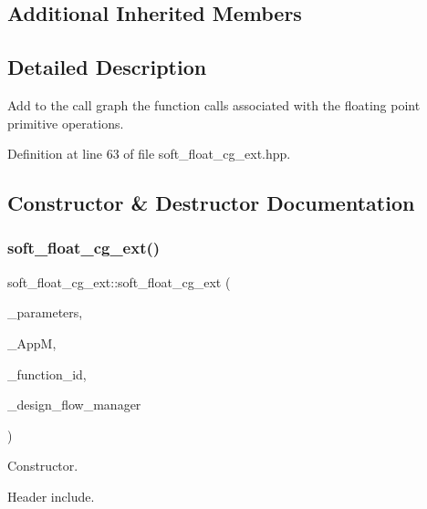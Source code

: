 \subsection*{Additional Inherited Members}


\subsection{Detailed Description}
Add to the call graph the function calls associated with the floating point primitive operations. 

Definition at line 63 of file soft\+\_\+float\+\_\+cg\+\_\+ext.\+hpp.



\subsection{Constructor \& Destructor Documentation}
\mbox{\label{classsoft__float__cg__ext_aab508ada521b1d4a59af2feb18ac9520}} 
\subsubsection{\texorpdfstring{soft\+\_\+float\+\_\+cg\+\_\+ext()}{soft\_float\_cg\_ext()}}
{\footnotesize\ttfamily soft\+\_\+float\+\_\+cg\+\_\+ext\+::soft\+\_\+float\+\_\+cg\+\_\+ext (\begin{DoxyParamCaption}\item[{const \hyperlink{Parameter_8hpp_a37841774a6fcb479b597fdf8955eb4ea}{Parameter\+Const\+Ref}}]{\+\_\+parameters,  }\item[{const \hyperlink{application__manager_8hpp_a04ccad4e5ee401e8934306672082c180}{application\+\_\+manager\+Ref}}]{\+\_\+\+AppM,  }\item[{unsigned int}]{\+\_\+function\+\_\+id,  }\item[{const Design\+Flow\+Manager\+Const\+Ref}]{\+\_\+design\+\_\+flow\+\_\+manager }\end{DoxyParamCaption})}



Constructor. 

Header include.


